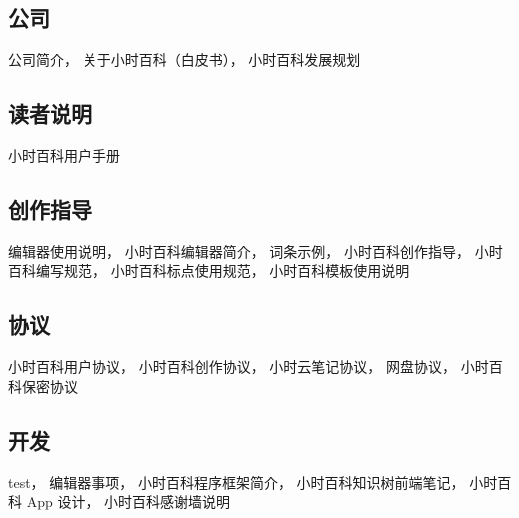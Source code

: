 
\subsection{公司}
公司简介，
关于小时百科（白皮书），
小时百科发展规划

\subsection{读者说明}
小时百科用户手册

\subsection{创作指导}
编辑器使用说明，
小时百科编辑器简介，
词条示例，
小时百科创作指导，
小时百科编写规范，
小时百科标点使用规范，
小时百科模板使用说明

\subsection{协议}
小时百科用户协议，
小时百科创作协议，
小时云笔记协议，
网盘协议，
小时百科保密协议

\subsection{开发}
test，
编辑器事项，
小时百科程序框架简介，
小时百科知识树前端笔记，
小时百科 App 设计，
小时百科感谢墙说明
